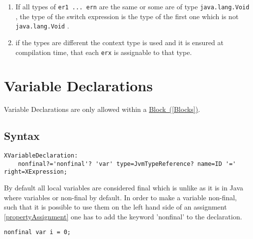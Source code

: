 \documentclass[a4paper,10pt]{scrreprt}
\newlength{\itemindentlen}
\begin{document}
\setlength{\itemindentlen}{\textwidth}
\begin{enumerate}
\addtolength{\itemindentlen}{-2em}

\item \begin{minipage}[t]{\itemindentlen}
If all types of \lstinline{er1 ... ern}
 are the same or some are of type \lstinline{java.lang.Void}
, the type of the switch expression is the type of the first one which is not \lstinline{java.lang.Void}
.
\end{minipage}

\item \begin{minipage}[t]{\itemindentlen}
if the types are different the context type is used and it is ensured at compilation time, that each \lstinline{erx}
 is assignable to that type.
\end{minipage}

\end{enumerate}
\addtolength{\itemindentlen}{2em}







\section{Variable Declarations}
\label{VariableDeclaration}
Variable Declarations are only allowed within a 
\hyperref[Blocks]{Block~(\ref*{Blocks})}. 

\subsection{Syntax}

\begin{lstlisting}
XVariableDeclaration:
	nonfinal?='nonfinal'? 'var' type=JvmTypeReference? name=ID '=' right=XExpression;

\end{lstlisting}


By default all local variables are considered final which is unlike as it is in Java where variables or non-final by default.
In order to make a variable non-final, such that it is possible to use them on the left hand side of an assignment 
\autoref{propertyAssignment} one has to add the keyword 'nonfinal' to the declaration.

\begin{lstlisting}
nonfinal var i = 0;

\end{lstlisting}
\end{document}
